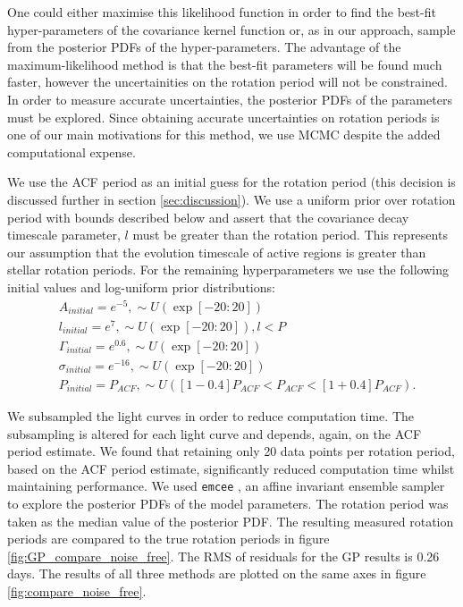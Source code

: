 One could either maximise this likelihood function in order to find the
best-fit hyper-parameters of the covariance kernel function or, as in our
approach, sample from the posterior PDFs of the hyper-parameters.
The advantage of the maximum-likelihood method is that the best-fit parameters
will be found much faster, however the uncertainities on the rotation period
will not be constrained.
In order to measure accurate uncertainties, the posterior PDFs of the
parameters must be explored.
Since obtaining accurate uncertainties on rotation periods is one of our main
motivations for this method, we use MCMC despite the added computational
expense.

We use the ACF period as an initial guess for the rotation period (this
decision is discussed further in section \textsection \ref{sec:discussion}).
We use a uniform prior over rotation period with bounds described below and
assert that the covariance decay timescale parameter, $l$ must be greater than
the rotation period.
This represents our assumption that the evolution timescale of active regions
is greater than stellar rotation periods.
For the remaining hyperparameters we use the following initial values and
log-uniform prior distributions:
\begin{eqnarray}
 	&	A_{initial} = e^{-5}, \sim U(\exp[-20:20]) \\ \nonumber
 	&	l_{initial} = e^{7}, \sim U(\exp[-20:20]), l<P \\ \nonumber
 	&	\Gamma_{initial} = e^{0.6}, \sim U(\exp[-20:20]) \\ \nonumber
 	&	\sigma_{initial} = e^{-16}, \sim U(\exp[-20:20]) \\ \nonumber
 	&	P_{initial} = P_{ACF}, \sim U([1 - 0.4]P_{ACF}<P_{ACF}<[1 +
0.4]P_{ACF}).
 \end{eqnarray}
 \label{eq:initialisation}

We subsampled the light curves in order to reduce computation time.
The subsampling is altered for each light curve and depends, again, on the ACF
period estimate.
We found that retaining only 20 data points per rotation period, based on the
ACF period estimate, significantly reduced computation time whilst maintaining
performance.
We used {\tt emcee} \citep{Foreman-Mackey2013}, an affine invariant ensemble
sampler to explore the posterior PDFs of the model parameters.
The rotation period was taken as the median value of the posterior PDF.
The resulting measured rotation periods are compared to the true rotation
periods in figure \ref{fig:GP_compare_noise_free}.
The RMS of residuals for the GP results is 0.26 days.
The results of all three methods are plotted on the same axes in figure
\ref{fig:compare_noise_free}.

